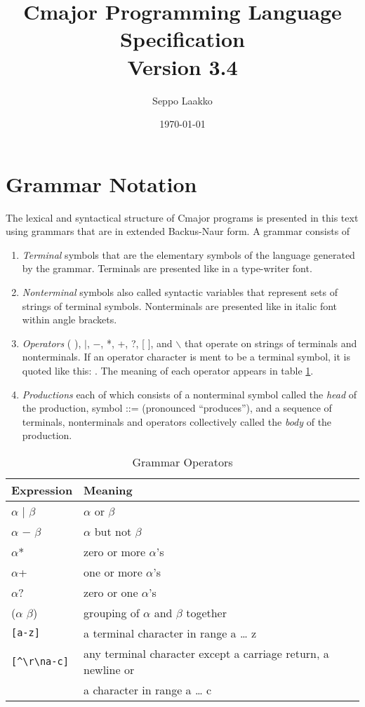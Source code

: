 \documentclass[a4paper,oneside,11pt]{article}
\begin{document}
\title{Cmajor Programming Language Specification\\Version 3.4}
\author{Seppo Laakko}
\date{\today}
\maketitle
\tableofcontents

\clearpage

\section{Grammar Notation}

The lexical and syntactical structure of Cmajor programs is presented in this text
using grammars that are in extended Backus-Naur form.
A grammar consists of

\begin{enumerate}
\item
\emph{Terminal} symbols that are the elementary symbols of the language generated by the grammar.
Terminals are presented like  in a type-writer font.
\item
\emph{Nonterminal} symbols also called syntactic variables that represent sets of strings of terminal symbols.
Nonterminals are presented like  in italic font within angle brackets.
\item
\emph{Operators} ( ), $|$, $-$, *, +, ?, [ ], and $\backslash$ that operate on strings of terminals and nonterminals.
If an operator character is ment to be a terminal symbol, it is quoted like this: \lit{*}.
The meaning of each operator appears in table \ref{tab:operators}.
\item
\emph{Productions} each of which consists of a nonterminal symbol called the \emph{head} of the production, symbol ::= (pronounced ``produces''), and
a sequence of terminals, nonterminals and operators collectively called the \emph{body} of the production.
\end{enumerate}

\begin{table}[htb]
\caption{Grammar Operators}\label{tab:operators}
\begin{tabular}{ll}
\bf{Expression}& \bf{Meaning}\\
\hline
$\alpha$ $|$ $\beta$ & $\alpha$ or $\beta$\\
$\alpha$ $-$ $\beta$ & $\alpha$ but not $\beta$\\
$\alpha$* & zero or more $\alpha$'s\\
$\alpha$+ & one or more $\alpha$'s\\
$\alpha$? & zero or one $\alpha$'s\\
($\alpha$ $\beta$) & grouping of $\alpha$ and $\beta$ together\\
\verb|[a-z]| & a terminal character in range a \ldots{} z\\
\verb|[^\r\na-c]| & any terminal character except a carriage return, a newline or\\& a character in range a \ldots{} c\\
\end{tabular}
\end{table}
\end{document}
